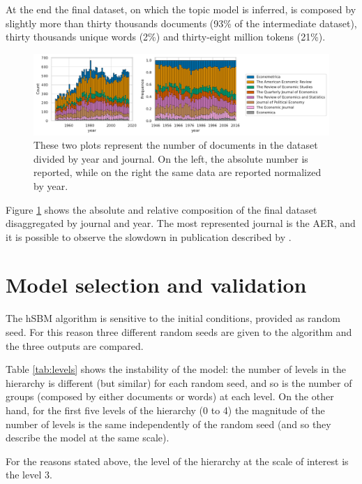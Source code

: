 \documentclass[a4paper, 11pt, headings=standardclasses, tablecaptionsbelow]{scrartcl}
\begin{document}
At the end the final dataset, on which the topic model is inferred, is composed by slightly more than thirty thousands documents (93\% of the intermediate dataset), thirty thousands unique words (2\%) and thirty-eight million tokens (21\%).

\begin{figure}[tb]
  \centering
  \includegraphics[width=\textwidth]{src/journals.pdf}
  \caption[Number of documents per journal and year]{These two plots represent the number of documents in the dataset divided by year and journal. On the left, the absolute number is reported, while on the right the same data are reported normalized by year.}
  \label{fig:journals}
\end{figure}

Figure \ref{fig:journals} shows the absolute and relative composition of the final dataset disaggregated by journal and year.
The most represented journal is the AER, and it is possible to observe the slowdown in publication described by \textcite{ellison2003,card2013}.

\section{Model selection and validation}
The hSBM algorithm is sensitive to the initial conditions, provided as random seed. For this reason three different random seeds are given to the algorithm and the three outputs are compared.



Table \ref{tab:levels} shows the instability of the model: the number of levels in the hierarchy is different (but similar) for each random seed, and so is the number of groups (composed by either documents or words) at each level.
On the other hand, for the first five levels of the hierarchy (0 to 4) the magnitude of the number of levels is the same independently of the random seed (and so they describe the model at the same scale).

For the reasons stated above, the level of the hierarchy at the scale of interest is the level 3.
\end{document}
